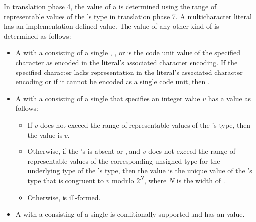\documentclass{wg21}
\begin{document}
\pnum
In translation phase 4,
the value of a  is determined
using the range of representable values
of the 's type in translation phase 7.
A  multicharacter literal
has an implementation-defined value.
The value of any other kind of 
is determined as follows:
\begin{itemize}
\item
A  with
a  consisting of a single
,
, or
is the code unit value of the specified character
as encoded in the literal's associated character encoding.
\removed{[Note:}
If the specified character lacks
representation in the literal's associated character encoding or
if it cannot be encoded as a single code unit,
then .
\removed{- end note]}
\item
A  with
a  consisting of
a single 
that specifies an integer value $v$ has a value as follows:
\begin{itemize}
    \item
    If $v$ does not exceed
    the range of representable values of the 's type,
    then the value is $v$.
    \item
    Otherwise,
    if the 's 
    is absent or , and
    $v$ does not exceed the range of representable values of the corresponding unsigned type for the underlying type of the 's type,
    then the value is the unique value of the 's type  that is congruent to $v$ modulo $2^N$, where $N$ is the width of .
    \item
    Otherwise,  is ill-formed.
\end{itemize}
\item
A  with
a  consisting of
a single 
is conditionally-supported and
has an  value.
\end{itemize}
\end{document}
